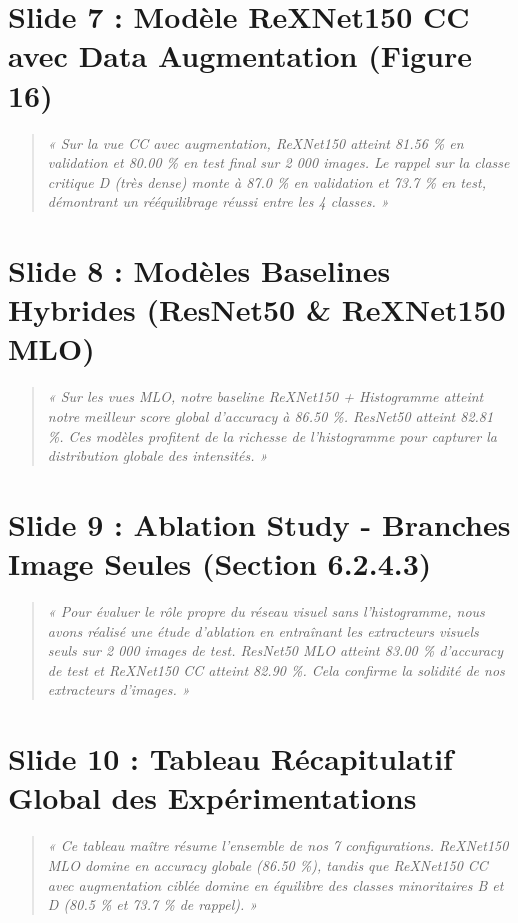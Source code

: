 \documentclass[11pt, a4paper]{article}
\begin{document}
\section{Slide 7 : Modèle ReXNet150 CC avec Data Augmentation (Figure 16)}
\begin{quote}
    \textit{« Sur la vue CC avec augmentation, ReXNet150 atteint 81.56 \% en validation et 80.00 \% en test final sur 2 000 images. Le rappel sur la classe critique D (très dense) monte à 87.0 \% en validation et 73.7 \% en test, démontrant un rééquilibrage réussi entre les 4 classes. »}
\end{quote}

\section{Slide 8 : Modèles Baselines Hybrides (ResNet50 \& ReXNet150 MLO)}
\begin{quote}
    \textit{« Sur les vues MLO, notre baseline ReXNet150 + Histogramme atteint notre meilleur score global d'accuracy à 86.50 \%. ResNet50 atteint 82.81 \%. Ces modèles profitent de la richesse de l'histogramme pour capturer la distribution globale des intensités. »}
\end{quote}

\section{Slide 9 : Ablation Study - Branches Image Seules (Section 6.2.4.3)}
\begin{quote}
    \textit{« Pour évaluer le rôle propre du réseau visuel sans l'histogramme, nous avons réalisé une étude d'ablation en entraînant les extracteurs visuels seuls sur 2 000 images de test. ResNet50 MLO atteint 83.00 \% d'accuracy de test et ReXNet150 CC atteint 82.90 \%. Cela confirme la solidité de nos extracteurs d'images. »}
\end{quote}

\section{Slide 10 : Tableau Récapitulatif Global des Expérimentations}
\begin{quote}
    \textit{« Ce tableau maître résume l'ensemble de nos 7 configurations. ReXNet150 MLO domine en accuracy globale (86.50 \%), tandis que ReXNet150 CC avec augmentation ciblée domine en équilibre des classes minoritaires B et D (80.5 \% et 73.7 \% de rappel). »}
\end{quote}
\end{document}

